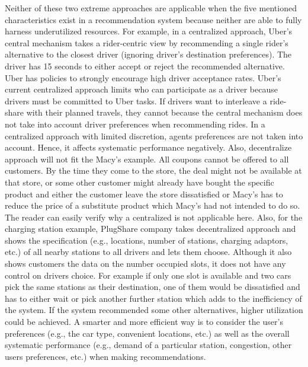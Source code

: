 \documentclass[11pt, letterpaper]{article}
\begin{document}
Neither of these two extreme approaches are applicable when the five mentioned characteristics exist in a recommendation system because neither are able to fully harness underutilized resources. For example, in a centralized approach, Uber's central mechanism takes a rider-centric view by recommending a single rider's alternative to the closest driver (ignoring driver's destination preferences).  The driver has 15 seconds to either accept or reject the recommended alternative.  Uber has policies to strongly encourage high driver acceptance rates. Uber's current centralized approach limits who can participate as a driver  because drivers must be committed to Uber tasks.  If drivers want to interleave a ride-share with their planned travels, they cannot because the central mechanism does not take into account driver preferences when recommending rides. In a centralized approach with limited discretion, agents preferences are not taken into account. Hence, it affects systematic performance negatively. Also, decentralize approach will not fit the Macy's example. All coupons cannot be offered to all customers. By the time they come to the store, the deal might not be available at that store, or some other customer might already have bought the specific product and either the customer leave the store dissatisfied or Macy's has to reduce the price of a substitute product which Macy's had not intended to do so. The reader can easily verify why a centralized is not applicable here.
Also, for the charging station example, PlugShare  company takes decentralized approach and shows the specification (e.g., locations, number of stations, charging adaptors, etc.) of all nearby stations to all drivers and lets them choose. Although it also shows customers the data on the number occupied slots, it does not have any control on drivers choice. For example if only one slot is available and two cars pick the same stations as their destination, one of them would be dissatisfied and has to either wait or pick another further station which adds to the inefficiency of the system. If the system recommended some other alternatives, higher utilization could be achieved. A smarter and more efficient way is to consider the user's preferences (e.g., the car type, convenient locations, etc.) as well as the overall systematic performance (e.g., demand of a particular station, congestion, other users preferences, etc.) when making recommendations. 
 
\end{document}
